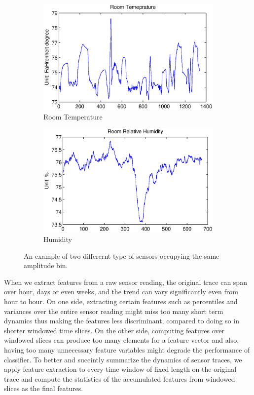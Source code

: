 \begin{figure}[ht!]
\centering
  \begin{subfigure}{0.22\textwidth}
                \centering
    \includegraphics[width=\textwidth]{./fig/rmt_ex.eps}
                \caption{Room Temperature}
  \end{subfigure}
  \begin{subfigure}{0.22\textwidth}
                \centering
    \includegraphics[width=\textwidth]{./fig/rh_ex.eps}
                \caption{Humidity}
  \end{subfigure}
\caption{An example of two differernt type of sensors occupying the same amplitude bin.}
\label{fig:same_bin}
\end{figure}

When we extract features from a raw sensor reading, the original trace can span over hour, days or even weeks, and
the trend can vary significantly even from hour to hour. On one side, extracting certain features such as percentiles and
variances over the entire sensor reading might miss too many short term dynamics thus making the features less discriminant, compared to doing so in shorter
windowed time slices. On the other side, computing features over windowed slices can produce too many elements for a
feature vector and also, having too many unnecessary feature variables might degrade the performance of classifier.
To better and succintly summarize the dynamics of sensor traces, we apply feature extraction to every time window of fixed length on the original trace and compute the statistics of the accumulated features from windowed slices as the final features. 

